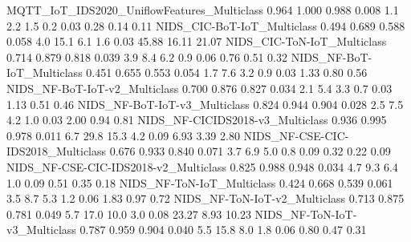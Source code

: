 MQTT_IoT_IDS2020_UniflowFeatures_Multiclass                              0.964      1.000       0.988      0.008          1.1          2.2           1.5          0.2         0.03         0.28          0.14         0.11
NIDS_CIC-BoT-IoT_Multiclass                                              0.494      0.689       0.588      0.058          4.0         15.1           6.1          1.6         0.03        45.88         16.11        21.07
NIDS_CIC-ToN-IoT_Multiclass                                              0.714      0.879       0.818      0.039          3.9          8.4           6.2          0.9         0.06         0.76          0.51         0.32
NIDS_NF-BoT-IoT_Multiclass                                               0.451      0.655       0.553      0.054          1.7          7.6           3.2          0.9         0.03         1.33          0.80         0.56
NIDS_NF-BoT-IoT-v2_Multiclass                                            0.700      0.876       0.827      0.034          2.1          5.4           3.3          0.7         0.03         1.13          0.51         0.46
NIDS_NF-BoT-IoT-v3_Multiclass                                            0.824      0.944       0.904      0.028          2.5          7.5           4.2          1.0         0.03         2.00          0.94         0.81
NIDS_NF-CICIDS2018-v3_Multiclass                                         0.936      0.995       0.978      0.011          6.7         29.8          15.3          4.2         0.09         6.93          3.39         2.80
NIDS_NF-CSE-CIC-IDS2018_Multiclass                                       0.676      0.933       0.840      0.071          3.7          6.9           5.0          0.8         0.09         0.32          0.22         0.09
NIDS_NF-CSE-CIC-IDS2018-v2_Multiclass                                    0.825      0.988       0.948      0.034          4.7          9.3           6.4          1.0         0.09         0.51          0.35         0.18
NIDS_NF-ToN-IoT_Multiclass                                               0.424      0.668       0.539      0.061          3.5          8.7           5.3          1.2         0.06         1.83          0.97         0.72
NIDS_NF-ToN-IoT-v2_Multiclass                                            0.713      0.875       0.781      0.049          5.7         17.0          10.0          3.0         0.08        23.27          8.93        10.23
NIDS_NF-ToN-IoT-v3_Multiclass                                            0.787      0.959       0.904      0.040          5.5         15.8           8.0          1.8         0.06         0.80          0.47         0.31
